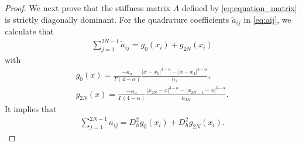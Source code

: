 \documentclass{amsart}
\theoremstyle{definition}
\theoremstyle{remark}
\numberwithin{equation}{section}
\begin{document}
\begin{proof}
 We next prove that the stiffness matrix \(A\) defined by \eqref{eq:equation_matrix} is strictly diagonally dominant.
 For the quadrature coefficients $\tilde{a}_{ij}$ in \eqref{eq:aij}, we calculate that
  \begin{equation*}
    \begin{aligned}
      \sum_{j=1}^{2N-1} \tilde{a}_{ij}
      = g_0(x_i) + g_{2N}(x_i) 
    \end{aligned}
  \end{equation*}
  with
  \begin{gather*}
    g_{0}(x) = \frac{-\kappa_\alpha}{\Gamma(4-\alpha)} \frac{|x-x_0|^{3-\alpha} - |x-x_1|^{3-\alpha}}{h_1} ,   \\
    g_{2N}(x) = \frac{-\kappa_\alpha}{\Gamma(4-\alpha)} \frac{|x_{2N}-x|^{3-\alpha} - |x_{2N-1}-x|^{3-\alpha}}{h_{2N}}.
  \end{gather*}
  It implies that
  \begin{equation*}
    \begin{aligned}
      \sum_{j=1}^{2N-1}a_{ij}        
      =     D_h^2 g_0(x_i) + D_h^2 g_{2N}(x_i) .
    \end{aligned}
  \end{equation*}
  

\end{proof}
\end{document}
